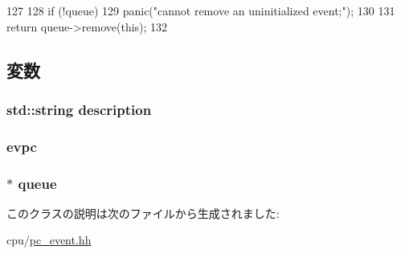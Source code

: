 \begin{DoxyCode}
127 {
128     if (!queue)
129         panic("cannot remove an uninitialized event;");
130 
131     return queue->remove(this);
132 }
\end{DoxyCode}


\subsection{変数}
\hypertarget{classPCEvent_a2e1454f6988673f814408646edaeb320}{
\subsubsection[{description}]{\setlength{\rightskip}{0pt plus 5cm}std::string {\bf description}}}
\label{classPCEvent_a2e1454f6988673f814408646edaeb320}
\hypertarget{classPCEvent_a2f62f1533392e0c5ea35f7553b4b175f}{
\subsubsection[{evpc}]{ {\bf evpc}}}
\label{classPCEvent_a2f62f1533392e0c5ea35f7553b4b175f}
\hypertarget{classPCEvent_ad4332d78b64319abad1ac79af25330c4}{
\subsubsection[{queue}]{$\ast$ {\bf queue}}}
\label{classPCEvent_ad4332d78b64319abad1ac79af25330c4}


このクラスの説明は次のファイルから生成されました:\begin{DoxyCompactItemize}
\item 
cpu/\hyperlink{pc__event_8hh}{pc\_\-event.hh}\end{DoxyCompactItemize}
